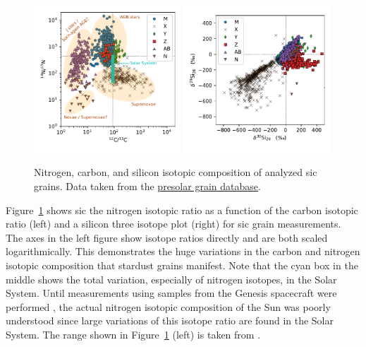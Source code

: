 \begin{figure}[tb]
    \centering
    \includegraphics[width=0.49\textwidth]{graphics/stardust/sic_n_c_all}
    \includegraphics[width=0.49\textwidth]{graphics/stardust/sic_si_3iso_all}
    \caption{Nitrogen, carbon, and silicon isotopic composition of analyzed \ac{sic} grains. Data taken from the \href{https://presolar.physics.wustl.edu/presolar-grain-database/}{presolar grain database}.}
    \label{fig:stardust:classification_c_n_si_data}
\end{figure}
Figure~\ref{fig:stardust:classification_c_n_si_data} shows \ac{sic} the nitrogen isotopic ratio as a function of the carbon isotopic ratio (left) and a silicon three isotope plot (right) for \ac{sic} grain measurements. The axes in the left figure show isotope ratios directly and are both scaled logarithmically. This demonstrates the huge variations in the carbon and nitrogen isotopic composition that stardust grains manifest. Note that the cyan box in the middle shows the total variation, especially of nitrogen isotopes, in the Solar System. Until measurements using samples from the Genesis spacecraft were performed \citep{marty11}, the actual nitrogen isotopic composition of the Sun was poorly understood since large variations of this isotope ratio are found in the Solar System. The range shown in Figure~\ref{fig:stardust:classification_c_n_si_data} (left) is taken from \citet{fueri15}. 


